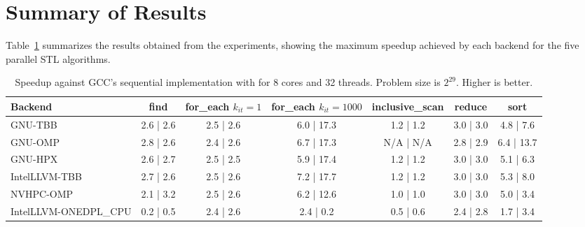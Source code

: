 \documentclass[sigconf]{acmart}
\begin{document}
\section{Summary of Results}
Table~\ref{tab:summary_speedup} summarizes the results obtained from the
experiments, showing the maximum speedup achieved by each backend for the five
parallel STL algorithms.

\begin{table}[t]
      \centering
      \centering
      \caption{Speedup against GCC's sequential implementation with for 8 cores and 32 threads. Problem size is $2^{29}$. Higher is better.}\label{tab:summary_speedup}
      \begin{tabular}{l c c c c c c}
            \hline
            \textbf{Backend}      & \textbf{find} & \makecell{\textbf{for\_each}                                                   \\$k_{it}=1$} & \makecell{\textbf{for\_each}\\$k_{it}=1000$} & \textbf{inclusive\_scan} & \textbf{reduce} & \textbf{sort} \\
            \hline
            GNU-TBB               & 2.6 | 2.6     & 2.5 | 2.6                    & 6.0 | 17.3 & 1.2 | 1.2 & 3.0 | 3.0 & 4.8 | 7.6  \\
            GNU-OMP               & 2.8 | 2.6     & 2.4 | 2.6                    & 6.7 | 17.3 & N/A | N/A & 2.8 | 2.9 & 6.4 | 13.7 \\
            GNU-HPX               & 2.6 | 2.7     & 2.5 | 2.5                    & 5.9 | 17.4 & 1.2 | 1.2 & 3.0 | 3.0 & 5.1 | 6.3  \\
            IntelLLVM-TBB         & 2.7 | 2.6     & 2.5 | 2.6                    & 7.2 | 17.7 & 1.2 | 1.2 & 3.0 | 3.0 & 5.3 | 8.0  \\
            NVHPC-OMP             & 2.1 | 3.2     & 2.5 | 2.6                    & 6.2 | 12.6 & 1.0 | 1.0 & 3.0 | 3.0 & 5.0 | 3.4  \\
            IntelLLVM-ONEDPL\_CPU & 0.2 | 0.5     & 2.4 | 2.6                    & 2.4 |  0.2 & 0.5 | 0.6 & 2.4 | 2.8 & 1.7 | 3.4  \\
            \hline
      \end{tabular}
\end{table}
\end{document}
